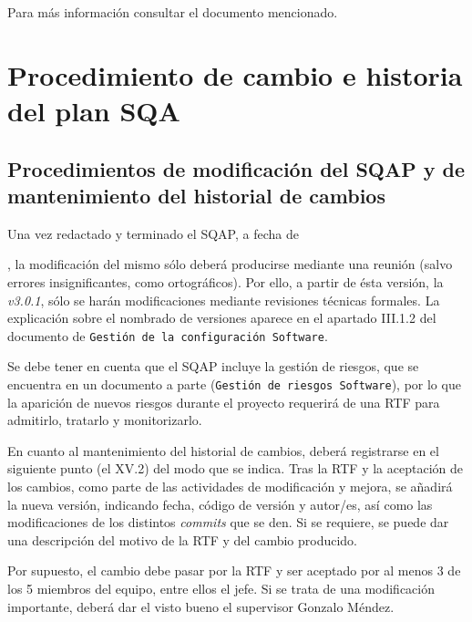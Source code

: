 \documentclass[spanish,a4paper,11pt, twoside]{report}	%
\begin{document}
	Para más información consultar el documento mencionado.


\newpage
\mbox{}
\thispagestyle{empty}						%
\newpage

\chapter{ Procedimiento de cambio e historia del plan SQA}
	\section{Procedimientos de modificación del SQAP y de mantenimiento del historial de cambios}
	
	Una vez redactado y terminado el SQAP, a fecha de \date{\Today}, la modificación del mismo sólo deberá producirse mediante una reunión (salvo errores insignificantes, como ortográficos). Por ello, a partir de ésta versión, la \textit{v3.0.1}, sólo se harán modificaciones mediante revisiones técnicas formales. La explicación sobre el nombrado de versiones aparece en el apartado III.1.2 del documento de \texttt{Gestión de la configuración Software}.

	Se debe tener en cuenta que el SQAP incluye la gestión de riesgos, que se encuentra en un documento a parte (\texttt{Gestión de riesgos Software}), por lo que la aparición de nuevos riesgos durante el proyecto requerirá de una RTF para admitirlo, tratarlo y monitorizarlo.

	En cuanto al mantenimiento del historial de cambios, deberá registrarse en el siguiente punto (el XV.2) del modo que se indica. Tras la RTF y la aceptación de los cambios, como parte de las actividades de modificación y mejora, se añadirá la nueva versión, indicando fecha, código de versión y autor/es, así como las modificaciones de los distintos \textit{commits} que se den. Si se requiere, se puede dar una descripción del motivo de la RTF y del cambio producido.
		
	Por supuesto, el cambio debe pasar por la RTF y ser aceptado por al menos 3 de los 5 miembros del equipo, entre ellos el jefe. Si se trata de una modificación importante, deberá dar el visto bueno el supervisor Gonzalo Méndez.
\end{document}
